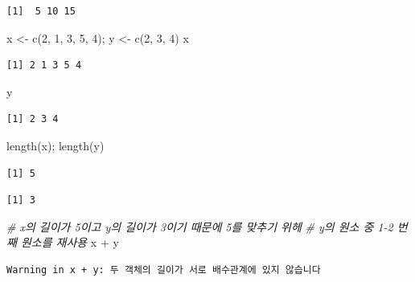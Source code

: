 \documentclass[
  11pt,
]{krantz}
\newenvironment{Shaded}{\begin{snugshade}}{\end{snugshade}}
\newcommand{\CommentTok}[1]{\textcolor[rgb]{0.37,0.37,0.37}{\textit{#1}}}
\newcommand{\DecValTok}[1]{\textcolor[rgb]{0.06,0.06,0.06}{#1}}
\newcommand{\FunctionTok}[1]{\textcolor[rgb]{0,0,0}{#1}}
\newcommand{\NormalTok}[1]{#1}
\newcommand{\OtherTok}[1]{\textcolor[rgb]{0.37,0.37,0.37}{#1}}
\newcommand{\SpecialCharTok}[1]{\textcolor[rgb]{0,0,0}{#1}}
\begin{document}
\begin{verbatim}
[1]  5 10 15
\end{verbatim}

\begin{Shaded}
\begin{Highlighting}[]
\NormalTok{x }\OtherTok{\textless{}{-}} \FunctionTok{c}\NormalTok{(}\DecValTok{2}\NormalTok{, }\DecValTok{1}\NormalTok{, }\DecValTok{3}\NormalTok{, }\DecValTok{5}\NormalTok{, }\DecValTok{4}\NormalTok{); y }\OtherTok{\textless{}{-}} \FunctionTok{c}\NormalTok{(}\DecValTok{2}\NormalTok{, }\DecValTok{3}\NormalTok{, }\DecValTok{4}\NormalTok{)}
\NormalTok{x}
\end{Highlighting}
\end{Shaded}

\begin{verbatim}
[1] 2 1 3 5 4
\end{verbatim}

\begin{Shaded}
\begin{Highlighting}[]
\NormalTok{y}
\end{Highlighting}
\end{Shaded}

\begin{verbatim}
[1] 2 3 4
\end{verbatim}

\begin{Shaded}
\begin{Highlighting}[]
\FunctionTok{length}\NormalTok{(x); }\FunctionTok{length}\NormalTok{(y)}
\end{Highlighting}
\end{Shaded}

\begin{verbatim}
[1] 5
\end{verbatim}

\begin{verbatim}
[1] 3
\end{verbatim}

\begin{Shaded}
\begin{Highlighting}[]
\CommentTok{\# x의 길이가 5이고 y의 길이가 3이기 때문에 5를 맞추기 위헤}
\CommentTok{\# y의 원소 중 1{-}2 번째 원소를 재사용}
\NormalTok{x }\SpecialCharTok{+}\NormalTok{ y}
\end{Highlighting}
\end{Shaded}

\begin{verbatim}
Warning in x + y: 두 객체의 길이가 서로 배수관계에 있지 않습니다
\end{verbatim}
\end{document}
